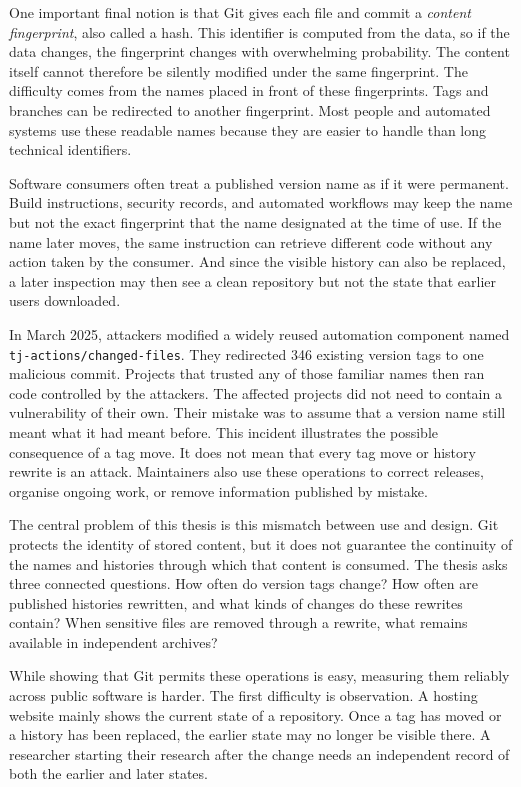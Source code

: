 \begin{SingleSpace}
One important final notion is that Git gives each file and commit a \emph{content fingerprint}, also called a hash.
This identifier is computed from the data, so if the data changes, the fingerprint changes with overwhelming probability.
The content itself cannot therefore be silently modified under the same fingerprint.
The difficulty comes from the names placed in front of these fingerprints.
Tags and branches can be redirected to another fingerprint.
Most people and automated systems use these readable names because they are easier to handle than long technical identifiers.

Software consumers often treat a published version name as if it were permanent.
Build instructions, security records, and automated workflows may keep the name but not the exact fingerprint that the name designated at the time of use.
If the name later moves, the same instruction can retrieve different code without any action taken by the consumer.
And since the visible history can also be replaced, a later inspection may then see a clean repository but not the state that earlier users downloaded.

In March 2025, attackers modified a widely reused automation component named\\ \texttt{tj-actions/changed-files}.
They redirected \num{346} existing version tags to one malicious commit.
Projects that trusted any of those familiar names then ran code controlled by the attackers.
The affected projects did not need to contain a vulnerability of their own.
Their mistake was to assume that a version name still meant what it had meant before.
This incident illustrates the possible consequence of a tag move.
It does not mean that every tag move or history rewrite is an attack.
Maintainers also use these operations to correct releases, organise ongoing work, or remove information published by mistake.

The central problem of this thesis is this mismatch between use and design.
Git protects the identity of stored content, but it does not guarantee the continuity of the names and histories through which that content is consumed.
The thesis asks three connected questions.
How often do version tags change?
How often are published histories rewritten, and what kinds of changes do these rewrites contain?
When sensitive files are removed through a rewrite, what remains available in independent archives?

While showing that Git permits these operations is easy, measuring them reliably across public software is harder.
The first difficulty is observation.
A hosting website mainly shows the current state of a repository.
Once a tag has moved or a history has been replaced, the earlier state may no longer be visible there.
A researcher starting their research after the change needs an independent record of both the earlier and later states.


\end{SingleSpace}
